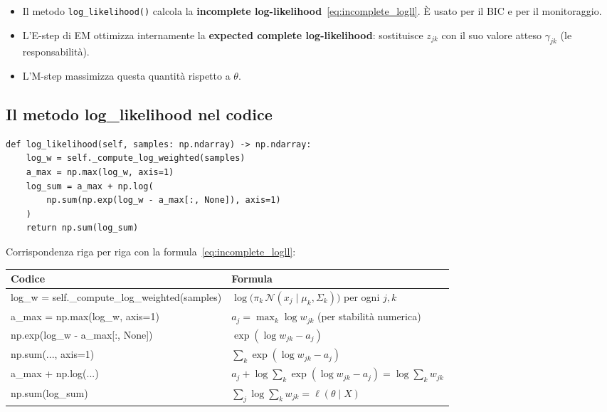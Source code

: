 \documentclass[11pt,a4paper]{article}
\begin{document}
\begin{infobox}
\begin{itemize}[nosep]
  \item Il metodo \texttt{log\_likelihood()} calcola la
        \textbf{incomplete log-likelihood}~\eqref{eq:incomplete_logll}.
        È usato per il BIC e per il monitoraggio.
  \item L'E-step di EM ottimizza internamente la
        \textbf{expected complete log-likelihood}: sostituisce $z_{jk}$
        con il suo valore atteso $\gamma_{jk}$ (le responsabilità).
  \item L'M-step massimizza questa quantità rispetto a $\theta$.
\end{itemize}
\end{infobox}

\subsection{Il metodo log\_likelihood nel codice}

\begin{lstlisting}[caption={Calcolo della incomplete log-likelihood}]
def log_likelihood(self, samples: np.ndarray) -> np.ndarray:
    log_w = self._compute_log_weighted(samples)
    a_max = np.max(log_w, axis=1)
    log_sum = a_max + np.log(
        np.sum(np.exp(log_w - a_max[:, None]), axis=1)
    )
    return np.sum(log_sum)
\end{lstlisting}

Corrispondenza riga per riga con la formula~\eqref{eq:incomplete_logll}:

\begin{center}
\renewcommand{\arraystretch}{1.4}
\begin{tabular}{>{\ttfamily\small}p{6.5cm} p{7.5cm}}
\toprule
\textbf{Codice} & \textbf{Formula} \\
\midrule
log\_w = self.\_compute\_log\_weighted(samples) &
$\log\bigl(\pi_k \, \mathcal{N}(x_j \mid \mu_k, \Sigma_k)\bigr)$
per ogni $j,k$ \\
a\_max = np.max(log\_w, axis=1) &
$a_j = \max_k \log w_{jk}$ (per stabilità numerica) \\
np.exp(log\_w - a\_max[:, None]) &
$\exp(\log w_{jk} - a_j)$ \\
np.sum(..., axis=1) &
$\sum_k \exp(\log w_{jk} - a_j)$ \\
a\_max + np.log(...) &
$a_j + \log\sum_k \exp(\log w_{jk} - a_j)
= \log\sum_k w_{jk}$ \\
np.sum(log\_sum) &
$\sum_j \log\sum_k w_{jk} = \ell(\theta \mid X)$ \\
\bottomrule
\end{tabular}
\end{center}
\end{document}
